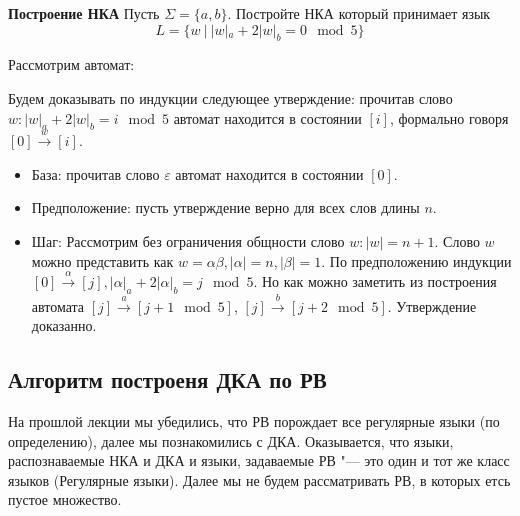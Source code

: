 \textbf{Построение НКА}
Пусть $\Sigma = \{a, b\}$. Постройте НКА который принимает язык $$ L = \{w\ | \ |w|_a + 2|w|_b = 0 \mod 5\} $$

Рассмотрим автомат:
\begin{center}
\end{center}
Будем доказывать по индукции следующее утверждение: прочитав слово $w : |w|_a + 2|w|_b = i \mod 5$ автомат находится в состоянии $[i]$, формально говоря $[0] \xrightarrow{w} [i]$.
\begin{itemize}
    \item База: прочитав слово $\varepsilon$ автомат находится в состоянии $[0]$.
    \item Предположение: пусть утверждение верно для всех слов длины $n$.
    \item Шаг: Рассмотрим без ограничения общности слово $w:|w|=n+1$. Слово $w$ можно представить как $w=\alpha\beta, |\alpha| = n, |\beta| = 1$. По предположению индукции $[0] \xrightarrow{\alpha} [j], |\alpha|_a + 2|\alpha|_b = j \mod 5$. Но как можно заметить из построения автомата $[j] \xrightarrow{a} [j+1 \mod 5]$, $[j] \xrightarrow{b} [j+2 \mod 5]$. Утверждение доказанно.
\end{itemize}

\subsection{Алгоритм построеня ДКА по РВ}
На прошлой лекции мы убедились, что РВ порождает все регулярные языки (по определению), далее мы познакомились с ДКА. Оказывается, что языки, распознаваемые НКА и ДКА и языки, задаваемые РВ "--- это один и тот же класс языков (Регулярные языки). Далее мы не будем рассматривать РВ, в которых етсь пустое множество.

